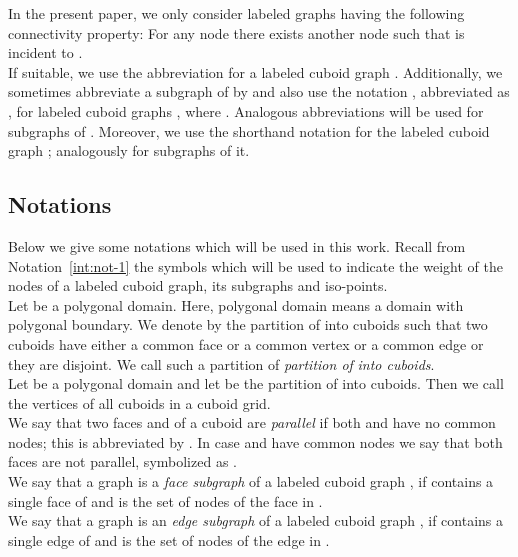 \documentclass[a4paper,11pt]{article}
\begin{document}
In the present paper, we only consider labeled graphs  having the following
connectivity property: For any node  there exists another node  such
that  is incident to . \\

If suitable, we use the abbreviation  for a labeled cuboid graph
. Additionally, we sometimes abbreviate a subgraph 
of  by  and also use the notation , abbreviated as , for
labeled cuboid graphs , where . Analogous abbreviations
will be used for subgraphs of . Moreover, we use the shorthand notation  for the labeled
cuboid graph ; analogously for subgraphs of it.

\subsection{Notations}
Below we give some notations which will be used in this work. Recall from Notation~\ref{int:not-1}
the symbols  which will be used to indicate the weight of the
nodes of a labeled cuboid graph, its subgraphs and iso-points.\\

Let  be a polygonal domain.
Here, polygonal domain means a domain with polygonal boundary. We denote by  the partition
of  into cuboids such that two cuboids have either a common face or a common
vertex or a common edge or they are disjoint. We call such a partition  of 
{\it partition of}  {\it into cuboids}.\\

Let  be a polygonal domain and let 
be the partition of  into cuboids. Then we call the vertices of all cuboids in
 a cuboid grid.\\

 We say that two faces  and  of a cuboid  are {\it parallel} if
both  and  have no common nodes; this is abbreviated by . In case  and 
have common nodes we say that both faces are not parallel, symbolized as .\\

We say that a graph  is a
{\it face subgraph} of a labeled cuboid graph , if  contains a single face of  and 
is the set of nodes of the face in .\\

We say that a graph  is an
{\it edge subgraph} of a labeled cuboid graph , if  contains a single edge of  and 
is the set of nodes of the edge in .\\
\end{document}
